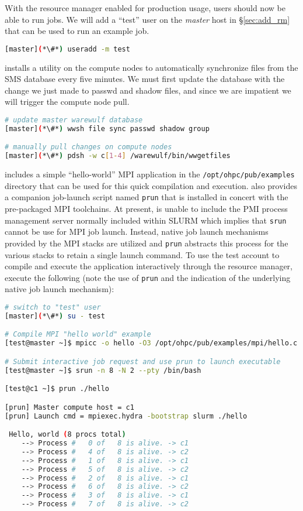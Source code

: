 With the resource manager enabled for production usage, users should now be
able to run jobs.  We will add a ``test'' user on the {\em master}
host in \S\ref{sec:add_rm} that can be used to run an example job.

\begin{lstlisting}[language=bash,keywords={}]
[master](*\#*) useradd -m test
\end{lstlisting}

\Warewulf{} installs a utility on the compute nodes to automatically 
synchronize files from the SMS database every five minutes. 
We must first update the database with the change we just made to passwd and 
shadow files, and since we are impatient we will trigger the compute node pull.

\begin{lstlisting}[language=bash,keywords={}]
# update master warewulf database
[master](*\#*) wwsh file sync passwd shadow group

# manually pull changes on compute nodes
[master](*\#*) pdsh -w c[1-4] /warewulf/bin/wwgetfiles 
\end{lstlisting}

\OHPC{} includes a simple ``hello-world'' MPI application in the
\texttt{/opt/ohpc/pub/examples} directory that can be used for this quick
compilation and execution. \OHPC{} also provides a companion job-launch
script named \texttt{prun} that is installed in concert with the pre-packaged
MPI toolchains. At present, \OHPC{} is unable to include the PMI process management
server normally included within SLURM which implies that \texttt{srun} cannot be
use for MPI job launch. Instead, native job launch mechanisms provided by the
MPI stacks are utilized and \texttt{prun} abstracts this process for the various
stacks to retain a single launch command. To use the test account to compile and execute the
application interactively through the resource manager, execute the following
(note the use of \texttt{prun} and the indication of the underlying native job
launch mechanism):

\begin{lstlisting}[language=bash,keywords={}]
# switch to "test" user
[master](*\#*) su - test

# Compile MPI "hello world" example
[test@master ~]$ mpicc -o hello -O3 /opt/ohpc/pub/examples/mpi/hello.c

# Submit interactive job request and use prun to launch executable
[test@master ~]$ srun -n 8 -N 2 --pty /bin/bash

[test@c1 ~]$ prun ./hello

[prun] Master compute host = c1
[prun] Launch cmd = mpiexec.hydra -bootstrap slurm ./hello

 Hello, world (8 procs total)
    --> Process #   0 of   8 is alive. -> c1
    --> Process #   4 of   8 is alive. -> c2
    --> Process #   1 of   8 is alive. -> c1
    --> Process #   5 of   8 is alive. -> c2
    --> Process #   2 of   8 is alive. -> c1
    --> Process #   6 of   8 is alive. -> c2
    --> Process #   3 of   8 is alive. -> c1
    --> Process #   7 of   8 is alive. -> c2
\end{lstlisting}

